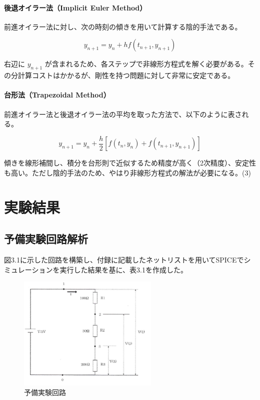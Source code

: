 \documentclass{jlreq}
\numberwithin{equation}{section}
\begin{document}
\paragraph{後退オイラー法（Implicit Euler Method）}
前進オイラー法に対し、次の時刻の傾きを用いて計算する陰的手法である。

\[
y_{n+1} = y_n + h f(t_{n+1}, y_{n+1})
\]

右辺に \( y_{n+1} \) が含まれるため、各ステップで非線形方程式を解く必要がある。その分計算コストはかかるが、剛性を持つ問題に対して非常に安定である。\\

\paragraph{台形法（Trapezoidal Method）}

前進オイラー法と後退オイラー法の平均を取った方法で、以下のように表される。

\[
y_{n+1} = y_n + \frac{h}{2} \left[ f(t_n, y_n) + f(t_{n+1}, y_{n+1}) \right]
\]

傾きを線形補間し、積分を台形則で近似するため精度が高く（2次精度）、安定性も高い。ただし陰的手法のため、やはり非線形方程式の解法が必要になる。(3)

\section{実験結果}
\subsection{予備実験回路解析}
図3.1に示した回路を構築し、付録に記載したネットリストを用いてSPICEでシミュレーションを実行した結果を基に、表3.1を作成した。


\begin{figure}[H]
  \centering
  \includegraphics[width=0.6\textwidth]{assets/yobiex.png}
  \caption{予備実験回路}
\end{figure}
\end{document}
